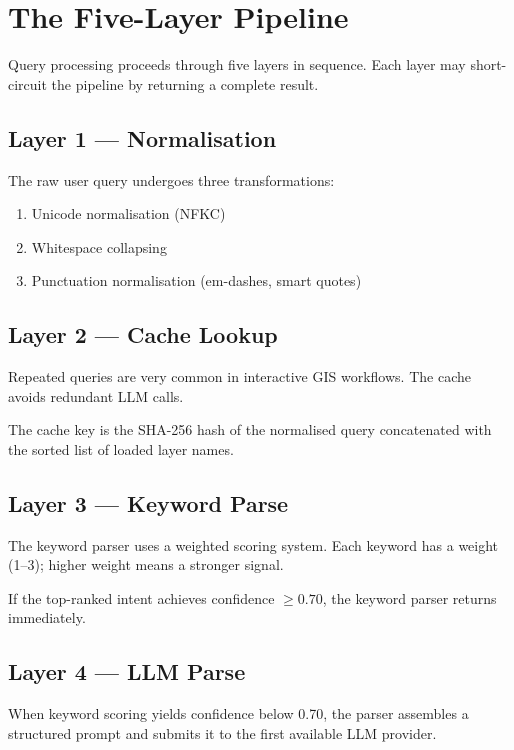 \documentclass[12pt,a4paper]{report}
\begin{document}
\section{The Five-Layer Pipeline}

Query processing proceeds through five layers in sequence. Each layer may short-circuit the pipeline by returning a complete result.

\subsection{Layer 1 — Normalisation}

The raw user query undergoes three transformations:

\begin{enumerate}
  \item Unicode normalisation (NFKC)
  \item Whitespace collapsing
  \item Punctuation normalisation (em-dashes, smart quotes)
\end{enumerate}

\subsection{Layer 2 — Cache Lookup}

Repeated queries are very common in interactive GIS workflows.  The cache avoids redundant LLM calls.

The cache key is the SHA-256 hash of the normalised query concatenated with the sorted list of loaded layer names.

\subsection{Layer 3 — Keyword Parse}

The keyword parser uses a weighted scoring system. Each keyword has a weight (1--3); higher weight means a stronger signal.

If the top-ranked intent achieves confidence $\geq 0.70$, the keyword parser returns immediately.

\subsection{Layer 4 — LLM Parse}

When keyword scoring yields confidence below 0.70, the parser assembles a structured prompt and submits it to the first available LLM provider.
\end{document}
